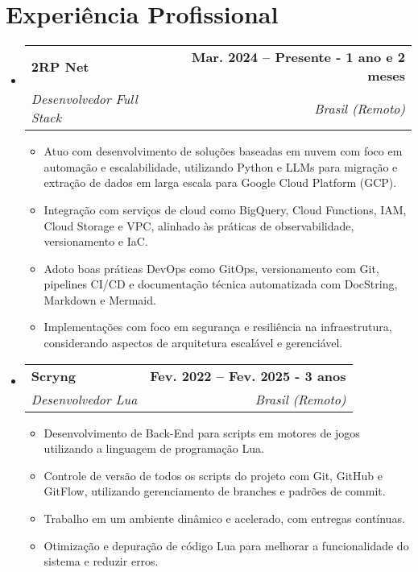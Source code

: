 \documentclass[letterpaper,11pt]{article}
\makeatletter
\newcommand{\resumeItem}[1]{
  \item\small{
    {#1 \vspace{-2pt}}
  }
}
\newcommand{\resumeSubheading}[4]{
  \vspace{-2pt}\item
    \begin{tabular*}{1.0\textwidth}[t]{l@{\extracolsep{\fill}}r}
      \textbf{#1} & \textbf{\small #2} \\
      \textit{\small#3} & \textit{\small #4} \\
    \end{tabular*}\vspace{-7pt}
}
\newcommand{\resumeSubHeadingListStart}{\begin{itemize}[leftmargin=0.0in, label={}]}
\newcommand{\resumeSubHeadingListEnd}{\end{itemize}}
\newcommand{\resumeItemListStart}{\begin{itemize}}
\newcommand{\resumeItemListEnd}{\end{itemize}\vspace{-5pt}}
\makeatother
\begin{document}
\section{Experiência Profissional}
  \resumeSubHeadingListStart

    \resumeSubheading
      {2RP Net}{Mar. 2024 -- Presente - 1 ano e 2 meses}
      {Desenvolvedor Full Stack}{Brasil (Remoto)}
      \resumeItemListStart
        \resumeItem{Atuo com desenvolvimento de soluções baseadas em nuvem com foco em automação e escalabilidade, utilizando Python e LLMs para migração e extração de dados em larga escala para Google Cloud Platform (GCP).}
        \resumeItem{Integração com serviços de cloud como BigQuery, Cloud Functions, IAM, Cloud Storage e VPC, alinhado às práticas de observabilidade, versionamento e IaC.}
        \resumeItem{Adoto boas práticas DevOps como GitOps, versionamento com Git, pipelines CI/CD e documentação técnica automatizada com DocString, Markdown e Mermaid.}
        \resumeItem{Implementações com foco em segurança e resiliência na infraestrutura, considerando aspectos de arquitetura escalável e gerenciável.}
      \resumeItemListEnd
      
    \resumeSubheading
      {Scryng}{Fev. 2022 -- Fev. 2025 - 3 anos}
      {Desenvolvedor Lua}{Brasil (Remoto)}
      \resumeItemListStart
        \resumeItem{Desenvolvimento de Back-End para scripts em motores de jogos utilizando a linguagem de programação Lua.}
        \resumeItem{Controle de versão de todos os scripts do projeto com Git, GitHub e GitFlow, utilizando gerenciamento de branches e padrões de commit.}
        \resumeItem{Trabalho em um ambiente dinâmico e acelerado, com entregas contínuas.}
        \resumeItem{Otimização e depuração de código Lua para melhorar a funcionalidade do sistema e reduzir erros.}
      \resumeItemListEnd

  \resumeSubHeadingListEnd
\vspace{-16pt}

\end{document}
